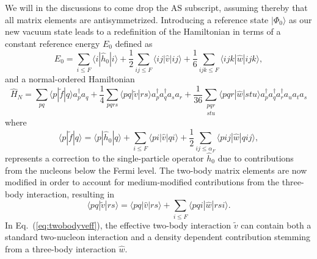 \documentclass[aps,showpacs,floatfix,nofootinbib,preprintnumbers,superscriptaddress,amsmath,amssymb]{revtex4-1}
\begin{document}
We will in the discussions to come drop the $\mathrm{AS}$ subscript,
assuming thereby that all matrix elements are antisymmetrized.
Introducing a reference state $|\Phi_0\rangle$ as our new vacuum state
leads to a redefinition of the Hamiltonian in terms of a constant
reference energy $E_0$ defined as
\[
E_0 = \sum_{i\le F}\langle i | \hat{h}_0|i\rangle+\frac{1}{2}\sum_{ij\le F} \langle ij|\hat{v}|ij\rangle +\frac{1}{6}\sum_{ijk\le F} \langle ijk|\hat{w}|ijk\rangle,
\]
and a normal-ordered Hamiltonian 
\[
  \hat{H}_N=\sum_{pq}\langle p|\tilde{f}|q\rangle a^\dagger_p a_q+\frac{1}{4} \sum_{pqrs} \langle pq|\tilde{v}|rs\rangle a^\dagger_p a^\dagger_q a_s  a_r +\frac{1}{36} \sum_{\substack{pqr \\stu}}
                 \langle pqr|\hat{w}|stu\rangle a^\dagger_p a^\dagger_q a^\dagger_r a_u a_t a_s 
\]
where
\[
\langle p| \tilde{f}|q\rangle = \langle p|\hat{h}_0|q\rangle +\sum_{i\le F} \langle pi|\hat{v}|qi\rangle+\frac{1}{2}\sum_{ij\le\alpha_F} \langle pij|\hat{w}|qij\rangle,
\] 
represents a correction to the single-particle operator $\hat{h}_0$ due to contributions from the nucleons below the Fermi level.
The two-body matrix elements are now modified in order to account for medium-modified contributions from the three-body interaction, resulting in
\begin{equation}
\langle pq|\tilde{v}|rs\rangle=\langle pq|\hat{v}|rs\rangle+\sum_{i\le F} \langle pqi|\hat{w}|rsi\rangle.
\label{eq:twobodyveff}
\end{equation}
In Eq.~(\ref{eq:twobodyveff}), the effective two-body interaction
$\tilde{v}$ can contain both a standard two-nucleon interaction and a
density dependent contribution stemming from a three-body interaction
$\hat{w}$.
\end{document}
